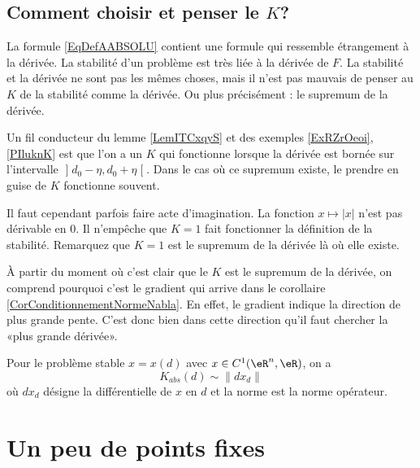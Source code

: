 \subsection{Comment choisir et penser le $K$?}

La formule \eqref{EqDefAABSOLU} contient une formule qui ressemble étrangement à la dérivée. La stabilité d'un problème est très liée à la dérivée de $F$. La stabilité et la dérivée ne sont pas les mêmes choses, mais il n'est pas mauvais de penser au $K$ de la stabilité comme la dérivée. Ou plus précisément : le supremum de la dérivée.

Un fil conducteur du lemme \ref{LemITCxqyS} et des exemples \ref{ExRZrOeoi}, \ref{PIluknK} est que l'on a un $K$ qui fonctionne lorsque la dérivée est bornée sur l'intervalle $\mathopen] d_0-\eta , d_0+\eta \mathclose[$. Dans le cas où ce supremum existe, le prendre en guise de $K$ fonctionne souvent.

Il faut cependant parfois faire acte d'imagination. La fonction $x\mapsto| x |$ n'est pas dérivable en $0$. Il n'empêche que $K=1$ fait fonctionner la définition de la stabilité. Remarquez que $K=1$ est le supremum de la dérivée là où elle existe.

À partir du moment où c'est clair que le $K$ est le supremum de la dérivée, on comprend pourquoi c'est le gradient qui arrive dans le corollaire \ref{CorConditionnementNormeNabla}. En effet, le gradient indique la direction de plus grande pente. C'est donc bien dans cette direction qu'il faut chercher la «plus grande dérivée».

\begin{proposition}
	Pour le problème stable $x=x(d)$ avec $x\in C^1(\eR^n,\eR)$, on a
	\begin{equation}
		K_{abs}(d)\sim\| dx_d \|
	\end{equation}
	où \( dx_d\) désigne la différentielle de $x$ en $d$ et la norme est la norme opérateur.
\end{proposition}

\section{Un peu de points fixes}
\label{SECooWUVTooMhmvaW}


